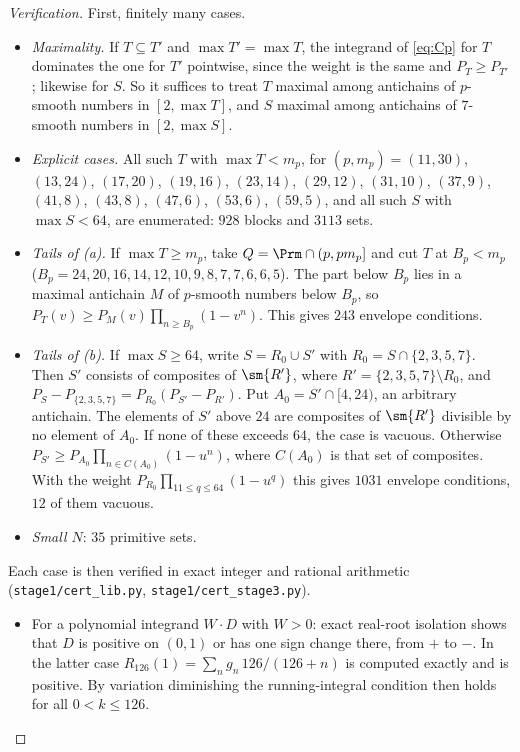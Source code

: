 \begin{proof}[Verification]
First, finitely many cases.
\begin{itemize}
\item \emph{Maximality.} If $T\subseteq T'$ and $\max T'=\max T$, the integrand of \eqref{eq:Cp}
for $T$ dominates the one for $T'$ pointwise, since the weight is the same and $P_T\ge P_{T'}$;
likewise for $S$. So it suffices to treat $T$ maximal among antichains of $p$-smooth numbers in
$[2,\max T]$, and $S$ maximal among antichains of $7$-smooth numbers in $[2,\max S]$.
\item \emph{Explicit cases.} All such $T$ with $\max T<m_p$, for
$(p,m_p)=(11,30)$, $(13,24)$, $(17,20)$, $(19,16)$, $(23,14)$, $(29,12)$, $(31,10)$, $(37,9)$,
$(41,8)$, $(43,8)$, $(47,6)$, $(53,6)$, $(59,5)$, and all such $S$ with $\max S<64$, are
enumerated: $928$ blocks and $3113$ sets.
\item \emph{Tails of (a).} If $\max T\ge m_p$, take $Q=\Prm\cap(p,pm_p]$ and cut $T$ at
$B_p<m_p$ ($B_p=24,20,16,14,12,10,9,8,7,7,6,6,5$). The part below $B_p$ lies in a maximal
antichain $M$ of $p$-smooth numbers below $B_p$, so $P_T(v)\ge P_M(v)\prod_{n\ge B_p}(1-v^n)$.
This gives $243$ envelope conditions.
\item \emph{Tails of (b).} If $\max S\ge64$, write $S=R_0\cup S'$ with $R_0=S\cap\{2,3,5,7\}$.
Then $S'$ consists of composites of $\sm{R'}$, where $R'=\{2,3,5,7\}\setminus R_0$, and
$P_S-P_{\{2,3,5,7\}}=P_{R_0}(P_{S'}-P_{R'})$. Put $A_0=S'\cap[4,24)$, an arbitrary antichain. The
elements of $S'$ above $24$ are composites of $\sm{R'}$ divisible by no element of $A_0$. If none of
these exceeds $64$, the case is vacuous. Otherwise
$P_{S'}\ge P_{A_0}\prod_{n\in C(A_0)}(1-u^n)$, where $C(A_0)$ is that set of composites. With the
weight $P_{R_0}\prod_{11\le q\le64}(1-u^q)$ this gives $1031$ envelope conditions, $12$ of them
vacuous.
\item \emph{Small $N$}: $35$ primitive sets.
\end{itemize}
Each case is then verified in exact integer and rational arithmetic
(\texttt{stage1/cert\_lib.py}, \texttt{stage1/cert\_stage3.py}).
\begin{itemize}
\item[(SC)] For a polynomial integrand $W\cdot D$ with $W>0$: exact real-root isolation shows
that $D$ is positive on $(0,1)$ or has one sign change there, from $+$ to $-$. In the latter case
$R_{126}(1)=\sum_ng_n\,126/(126+n)$ is computed exactly and is positive. By variation diminishing
the running-integral condition then holds for all $0<k\le126$.

\end{itemize}
\end{proof}
